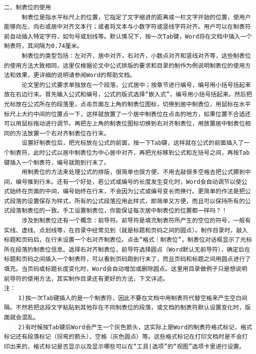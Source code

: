 \begin{verbatim}
二、制表位的使用 
     制表位是指水平标尺上的位置，它指定了文字缩进的距离或一栏文字开始的位置，使用户能够向左、向右或居中对齐文本行；或者将文本与小数字符或竖线字符对齐。用户可以在制表符前自动插入特定字符，如句号或划线等。默认情况下，按一次Tab键，Word将在文档中插入一个制表符，其间隔为0.74厘米。 
     制表位的类型包括：左对齐，居中对齐，右对齐，小数点对齐和竖线对齐等，这些制表位的使用方法大致相同，这里仅根据论文中公式排版的要求和目录的制作为例说明制表位的使用方法和效果，更详细的说明请参阅Word的帮助文档。 
     论文里的公式要求单独放在一个段落，公式居中；按章节进行编号，编号用小括号括起来放在右边行末。首先输入公式和编号，公式的版式选择“嵌入式”，编号用小括号括起来。然后把光标放在公式所在的段落里，点击页面左上角的制表位图标，切换到居中制表位，用鼠标在水平标尺上大约中间的位置点一下，这样就放置了一个居中制表位在点击的地方，如果位置不合适还可以用鼠标拖动进行调节。再把左上角的制表位图标切换到右对齐制表位，用放置居中制表位相同的方法放置一个右对齐制表位在行末。 
     设置好制表位后，把光标放在公式的前面，按一下Tab键，这样就在公式的前面插入了一个制表符，此时公式以居中制表位为中心居中对齐，再把光标移到公式和左括号之间，再按Tab键插入一个制表符，编号就跑到行末了。 
     用制表位的方法来处理公式的排版，很简单也很方便，不用去敲很多空格去把公式挪到中间，编号推到行末。还有一个好处，若公式或编号的长度发生变化时，Word会自动调节以使公式始终在页面的中间，编号始终在行末，不会因为公式或编号变长而换行。更简单的作法是把公式段落的设置保存为样式，所有的公式段落应用此样式，即简单又方便，而且可以保持所有的公式段落制表位的一致。手工设置制表位，你能保证每次居中制表位的位置都一样吗？！ 
     涉及到制表位还有一个概念：前导符。前导符是填充制表符所产生的空位的符号，一般有实线、虚线、点划线等，在目录中经常见到（就是标题和页码之间的圆点）。制作目录时，敲入标题和页码后，在行末设置一个右对齐制表位。点击“格式｜制表位”，制表位对话框显示了光标所在段落的制表位信息。选择右对齐制表位，前导符选择圆点（Word默认无前导符），确定后在标题和页码之间插入一个制表符，可以看到页码跑到行末了，而且页码和标题之间用圆点进行了填充。当页码或标题长度变化时，Word会自动增加或删除圆点。这里用目录做例子只是想说明前导符的使用方法，其实制作目录还有更好的方法，下文详述。 
注： 
    1)按一次Tab键插入的是一个制表符，因此不要在文档中用制表符代替空格来产生空白间隔。不然若把这段文字粘贴到其他存在不同制表位的段落，或文档的制表符默认设置变化时，版面就会混乱。 
    2)有时候按Tab键后Word会产生一个灰色箭头，这实际上是Word的制表符格式标记，格式标记还有段落标记（拐弯的箭头）、空格（灰色圆点）等。这些格式标记在打印文档时是不会打印出来的，格式标记是否显示以及显示哪些可以在“工具|选项”的“视图”选项卡里进行设置。


\end{verbatim}
